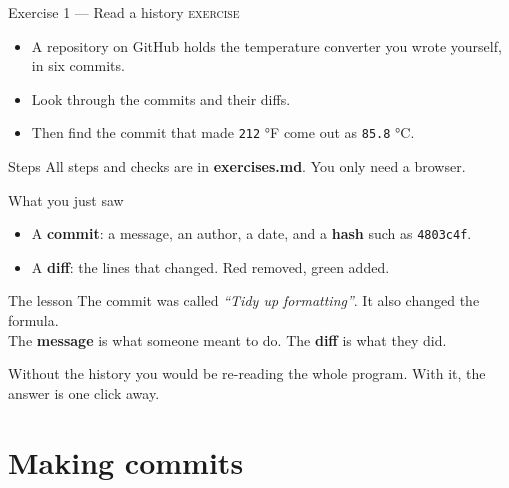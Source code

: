 \documentclass[aspectratio=169,11pt]{beamer}
\newcommand{\code}[1]{\texttt{#1}}
\newcommand{\key}[1]{\textbf{\textcolor{ban}{#1}}}
\newcommand{\exerciseframe}[3]{%
  \begin{frame}[t]{#1}
    \vspace{0.4em}
    {\small\textcolor{softgray}{\textsc{exercise}}}\par\vspace{0.6em}
    #2
    \vfill
    \begin{block}{Steps}
      All steps and checks are in \key{exercises.md}. #3
    \end{block}
    \vspace{0.6em}
  \end{frame}}
\begin{document}
\exerciseframe{Exercise 1 --- Read a history}{%
  \begin{itemize}
    \item A repository on GitHub holds the temperature converter you wrote yourself, in six commits.
    \item Look through the commits and their diffs.
    \item Then find the commit that made \code{212} °F come out as \code{85.8} °C.
  \end{itemize}}{You only need a browser.}

\begin{frame}{What you just saw}
  \begin{itemize}
    \item A \key{commit}: a message, an author, a date, and a \key{hash} such as \code{4803c4f}.
    \item A \key{diff}: the lines that changed. \textcolor{bad}{Red} removed, \textcolor{good}{green} added.
  \end{itemize}
  \vspace{0.8em}
  \begin{block}{The lesson}
    The commit was called \emph{``Tidy up formatting''}. It also changed the formula.\\[0.3em]
    The \textbf{message} is what someone meant to do. The \textbf{diff} is what they did.
  \end{block}
  \vspace{0.5em}
  Without the history you would be re-reading the whole program. With it, the answer is one click away.
\end{frame}

\section{Making commits}
\end{document}
